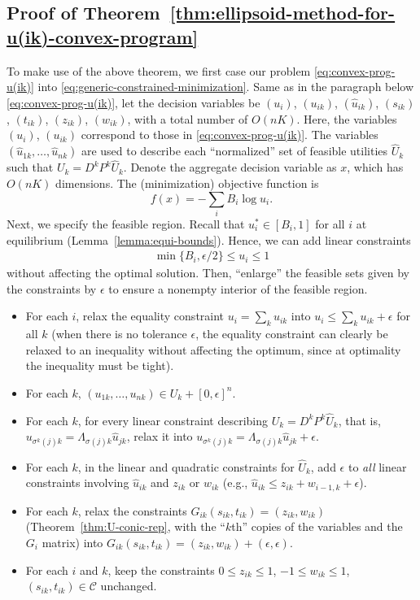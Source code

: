 \subsection*{Proof of Theorem~\ref{thm:ellipsoid-method-for-u(ik)-convex-program}}
To make use of the above theorem, we first case our problem \eqref{eq:convex-prog-u(ik)} into \eqref{eq:generic-constrained-minimization}. Same as in the paragraph below \eqref{eq:convex-prog-u(ik)}, 
let the decision variables be $(u_i)$, $(u_{ik})$, $(\hat{u}_{ik})$, $(s_{ik})$, $(t_{ik})$, $(z_{ik})$, $(w_{ik})$, with a total number of $O(nK)$. 
Here, the variables $(u_i)$, $(u_{ik})$ correspond to those in \eqref{eq:convex-prog-u(ik)}. 
The variables $(\hat{u}_{1k}, \dots, \hat{u}_{nk})$ are used to describe each ``normalized'' set of feasible utilities $\hat{U}_k$ such that $U_k = D^k P^k \hat{U}_k$.
Denote the aggregate decision variable as $x$, which has $O(nK)$ dimensions. The (minimization) objective function is 
\[ f(x) = - \sum_i B_i \log u_i.\] 
Next, we specify the feasible region. 
Recall that $u^*_i \in [B_i, 1]$ for all $i$ at equilibrium (Lemma~\ref{lemma:equi-bounds}). 
Hence, we can add linear constraints 
\begin{align}
	\min\{B_i, \epsilon/2\} \leq u_i \leq 1
	\label{eq:ellipsoid-complexity-proof-u_i-bounds}
\end{align}
without affecting the optimal solution. 
Then, ``enlarge'' the feasible sets given by the constraints by $\epsilon$ to ensure a nonempty interior of the feasible region.
\begin{itemize}
	\item For each $i$, relax the equality constraint $u_i = \sum_k u_{ik}$ into $u_i \leq \sum_k u_{ik} + \epsilon$ for all $k$ (when there is no tolerance $\epsilon$, the equality constraint can clearly be relaxed to an inequality without affecting the optimum, since at optimality the inequality must be tight).
	\item For each $k$, $(u_{1k}, \dots, u_{nk})\in U_k + [0,\epsilon]^n$.
	\item For each $k$, for every linear constraint describing $U_k = D^k P^k \hat{U}_k$, that is, $u_{\sigma^k(j)k} = \Lambda_{\sigma(j) k} \hat{u}_{jk}$, relax it into $u_{\sigma^k(j)k} = \Lambda_{\sigma(j) k} \hat{u}_{jk} + \epsilon$.
	\item For each $k$, in the linear and quadratic constraints for $\hat{U}_k$, add $\epsilon$ to \emph{all} linear constraints involving $\hat{u}_{ik}$ and $z_{ik}$ or $w_{ik}$ (e.g., $\hat{u}_{ik} \leq z_{ik} + w_{i-1,k} + \epsilon$).
	\item For each $k$, relax the constraints $G_{ik} (s_{ik}, t_{ik}) = (z_{ik}, w_{ik})$ (Theorem~\ref{thm:U-conic-rep}, with the ``$k$th'' copies of the variables and the $G_i$ matrix) into $G_{ik} (s_{ik}, t_{ik}) = (z_{ik}, w_{ik}) + (\epsilon, \epsilon)$.
	\item For each $i$ and $k$, keep the constraints $0\leq z_{ik}\leq 1$, $-1\leq w_{ik}\leq 1$, $(s_{ik}, t_{ik})\in\mathcal{C}$ unchanged.
\end{itemize}

